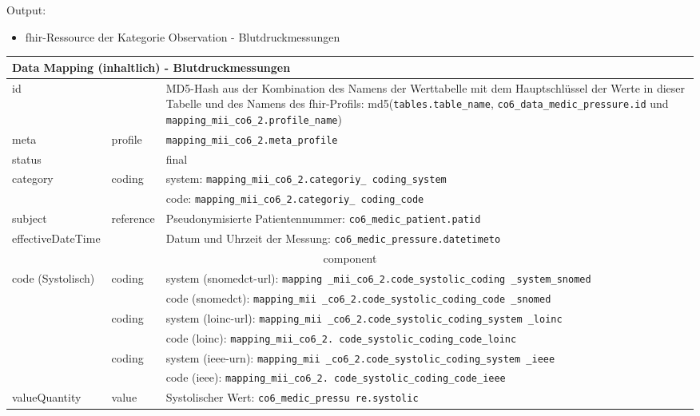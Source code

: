 Output:
\begin{itemize}
	\item \ac{fhir}-Ressource der Kategorie \glqq Observation\grqq{} - Blutdruckmessungen
\end{itemize}
\clearpage
\begin{longtable}{|l|l|p{7cm}|} 
	\hline
	\multicolumn{3}{|l|}{\bfseries Data Mapping (inhaltlich) - Blutdruckmessungen} \\ \hline
	id &  & MD5-Hash aus der Kombination des Namens der Werttabelle mit dem Hauptschlüssel der Werte in dieser Tabelle und des Namens des \ac{fhir}-Profils: md5(\texttt{tables.table\_name}, \texttt{co6\_data\_medic\_pressure.id} und \texttt{mapping\_mii\_co6\_2.profile\_name}) \\ \hline
	meta & profile & \texttt{mapping\_mii\_co6\_2.meta\_profile} \\ \hline 
	status &  & final  \\ \hline 
	category & coding & system: \texttt{mapping\_mii\_co6\_2.categoriy\_ coding\_system} \\ 
	\cline{3-3}
	& & code: \texttt{mapping\_mii\_co6\_2.categoriy\_ coding\_code} \\ \hline
	subject & reference & Pseudonymisierte Patientennummer: \texttt{co6\_medic\_patient.patid} \\ \hline	
	effectiveDateTime & & Datum und Uhrzeit der Messung:  \texttt{co6\_medic\_pressure.datetimeto} \\ \hline
	\multicolumn{3}{|c|}{component} \\ \hline
	code (Systolisch) & coding & system (\ac{snomedct}-\acs{url}): \texttt{mapping \_mii\_co6\_2.code\_systolic\_coding \_system\_snomed} \\ 
	\cline{3-3} 
	&  & code (\ac{snomedct}): \texttt{mapping\_mii \_co6\_2.code\_systolic\_coding\_code \_snomed} \\
	\cline{2-3} 
	&  coding & system (\ac{loinc}-\ac{url}): \texttt{mapping\_mii \_co6\_2.code\_systolic\_coding\_system \_loinc} \\ 
	\cline{3-3} 
	&  & code (\ac{loinc}): \texttt{mapping\_mii\_co6\_2. code\_systolic\_coding\_code\_loinc} \\ 
	\cline{2-3} 
	&  coding & system (\ac{ieee}-\acs{urn}): \texttt{mapping\_mii \_co6\_2.code\_systolic\_coding\_system \_ieee} \\ 
	\cline{3-3} 
	&  & code (\ac{ieee}): \texttt{mapping\_mii\_co6\_2. code\_systolic\_coding\_code\_ieee} \\ \hline
	valueQuantity & value & Systolischer Wert: \texttt{co6\_medic\_pressu re.systolic} \\

\end{longtable}
